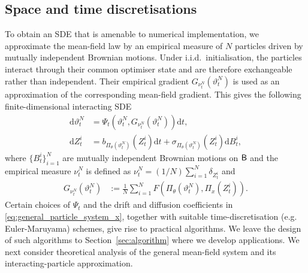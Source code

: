 \subsection{Space and time discretisations}

To obtain an SDE that is amenable to numerical implementation, we approximate the mean-field law by an empirical measure of \(N\) particles driven by mutually independent Brownian motions. Under i.i.d.\ initialisation, the particles interact through their common optimiser state and are therefore exchangeable rather than independent. Their empirical gradient \(G_{\nu_t^N}(\vartheta_t^N)\) is used as an approximation of the corresponding mean-field gradient. This gives the following finite-dimensional interacting SDE
\begin{align}
\mathrm{d} \vartheta^N_t &= \Psi_t(\vartheta^N_t,G_{\nu_t^N}(\vartheta_t^N) ) \mathrm{d} t,\label{eq:general_particle_system_opt}\\
\mathrm{d} Z^i_t &= b_{\Pi_\theta(\vartheta^N_t)}(Z^i_t) \mathrm{d}t  +\sigma_{\Pi_\theta(\vartheta^N_t)}(Z^i_t)\mathrm{d}B^i_t,\label{eq:general_particle_system_x}
\end{align}
where $\{B^i_t\}_{i=1}^N$ are mutually independent Brownian motions on ${\mathsf{B}}$ and the empirical measure $\nu_t^N$ is defined as $\nu_t^N =({1}/{N}) \sum_{i=1}^N \delta_{Z^i_t}$ and
\begin{align}
G_{\nu_t^N}(\vartheta_t^N)&:=\frac{1}{N}\sum_{i=1}^N F(\Pi_{\theta}(\vartheta^N_t),\Pi_{x}(Z^i_t)). \nonumber
\end{align}
Certain choices of $\Psi_t$ and the drift and diffusion coefficients in \eqref{eq:general_particle_system_x}, together with suitable time-discretisation (e.g. Euler-Maruyama) schemes, give rise to practical algorithms. We leave the design of such algorithms to Section~\ref{sec:algorithm} where we develop applications. We next consider theoretical analysis of the general mean-field system and its interacting-particle approximation.